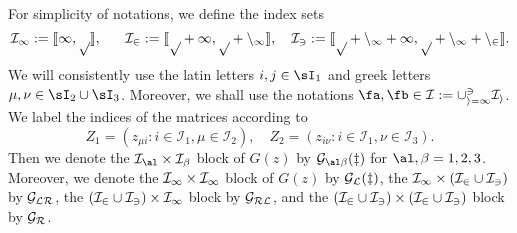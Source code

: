 For simplicity of notations, we define the index sets
$$\cal I_1:=\llbracket 1,p\rrbracket, \ \quad \ \cal I_2:=\llbracket p+1,p+n_1\rrbracket, \quad \cal I_3:=\llbracket p+n_1+1,p+n_1+n_2\rrbracket .$$
 We will consistently use the latin letters $i,j\in\sI_{1}$ and greek letters $\mu,\nu\in\sI_{2}\cup \sI_{3}$. Moreover, we shall use the notations $\fa,\fb\in \cal I:=\cup_{i=1}^3 \cal I_i$. We label the indices of the matrices according to
 $$Z_1= (z_{\mu i}:i\in \mathcal I_1, \mu \in \mathcal I_2), \quad Z_2= (z_{i\nu}:i\in \mathcal I_1, \nu \in \mathcal I_3).$$
Then we denote the $\cal I_\al \times \cal I_\beta$ block of $ G(z)$ by $ \cal G_{\al\beta}(z)$ for $\al,\beta=1,2,3$. Moreover,  we denote the $\cal I_1 \times \cal I_1$ block of $ G(z)$ by $ \cal G_{L}(z)$, the $\cal I_1 \times (\cal I_2 \cup \cal I_3)$ by $\cal G_{LR}$, the $ (\cal I_2 \cup \cal I_3)\times \cal I_1$ block by $\cal G_{RL}$, and the $ (\cal I_2 \cup \cal I_3)\times (\cal I_2 \cup \cal I_3)$ block by $\cal G_R$. 
